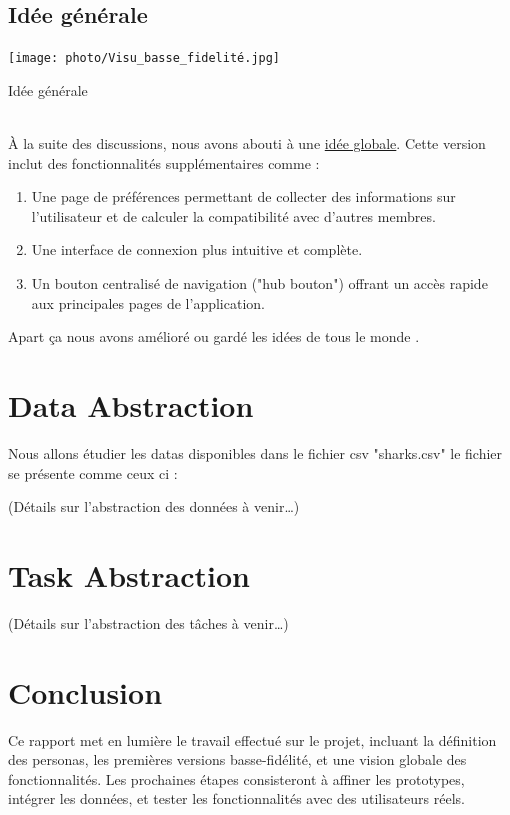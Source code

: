 \documentclass{article}
\begin{document}
\subsection{Idée générale}
\texttt{[image: photo/Visu\_basse\_fidelité.jpg]}\caption{Idée générale}
\label{fig:général}
\vspace{1cm}\\
À la suite des discussions, nous avons abouti à une \hyperref[fig:général]{idée globale}. 
Cette version inclut des fonctionnalités supplémentaires comme :
\begin{enumerate}
    \item Une page de préférences permettant de collecter des informations sur l’utilisateur et de calculer la compatibilité avec d’autres membres.

    \item Une interface de connexion plus intuitive et complète.

    \item Un bouton centralisé de navigation ("hub bouton") offrant un accès rapide aux principales 
    pages de l’application.
\end{enumerate}
Apart ça nous avons amélioré ou gardé les idées de tous le monde . 

\newpage
\section{Data Abstraction}
\label{sec:data}
Nous allons étudier les datas disponibles dans le fichier csv "sharks.csv" le fichier se présente comme ceux ci :



(Détails sur l'abstraction des données à venir…)

\section{Task Abstraction}
(Détails sur l'abstraction des tâches à venir…)

\section{Conclusion}
Ce rapport met en lumière le travail effectué sur le projet, incluant la définition des personas, 
les premières versions basse-fidélité, et une vision globale des fonctionnalités. 
Les prochaines étapes consisteront à affiner les prototypes, intégrer les données, et tester 
les fonctionnalités avec des utilisateurs réels. 
\end{document}
